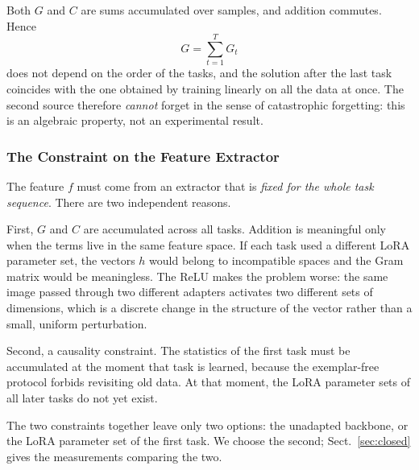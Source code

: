 \documentclass[11pt,a4paper]{article}
\begin{document}
Both $G$ and $C$ are sums accumulated over samples, and addition commutes.
Hence
\begin{equation}
G = \sum_{t=1}^{T} G_t
\end{equation}
does not depend on the order of the tasks, and the solution after the last task
coincides with the one obtained by training linearly on all the data at once.
The second source therefore \emph{cannot} forget in the sense of catastrophic
forgetting: this is an algebraic property, not an experimental result.

\subsubsection{The Constraint on the Feature Extractor}
\label{sec:fixed-extractor}

The feature $f$ must come from an extractor that is \emph{fixed for the whole
task sequence}. There are two independent reasons.

First, $G$ and $C$ are accumulated across all tasks. Addition is meaningful only
when the terms live in the same feature space. If each task used a different
LoRA parameter set, the vectors $h$ would belong to incompatible spaces and the
Gram matrix would be meaningless. The ReLU makes the problem worse: the same
image passed through two different adapters activates two different sets of
dimensions, which is a discrete change in the structure of the vector rather
than a small, uniform perturbation.

Second, a causality constraint. The statistics of the first task must be
accumulated at the moment that task is learned, because the exemplar-free
protocol forbids revisiting old data. At that moment, the LoRA parameter sets of
all later tasks do not yet exist.

The two constraints together leave only two options: the unadapted backbone, or
the LoRA parameter set of the first task. We choose the second;
Sect.~\ref{sec:closed} gives the measurements comparing the two.
\end{document}
